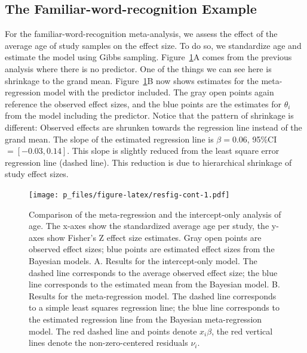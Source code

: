 \documentclass[english,,man]{apa6}
\begin{document}
\hypertarget{the-familiar-word-recognition-example}{%
\subsection{The Familiar-word-recognition Example}\label{the-familiar-word-recognition-example}}

For the familiar-word-recognition meta-analysis, we assess the effect of the average age of study samples on the effect size. To do so, we standardize age and estimate the model using Gibbs sampling. Figure~\ref{fig:resfig-cont}A comes from the previous analysis where there is no predictor. One of the things we can see here is shrinkage to the grand mean. Figure~\ref{fig:resfig-cont}B now shows estimates for the meta-regression model with the predictor included. The gray open points again reference the observed effect sizes, and the blue points are the estimates for \(\theta_i\) from the model including the predictor. Notice that the pattern of shrinkage is different: Observed effects are shrunken towards the regression line instead of the grand mean. The slope of the estimated regression line is \(\beta = 0.06\), 95\%CI \(= [-0.03, 0.14]\). This slope is slightly reduced from the least square error regression line (dashed line). This reduction is due to hierarchical shrinkage of study effect sizes.

\begin{figure}
\centering
\texttt{[image: p\_files/figure-latex/resfig-cont-1.pdf]}
\caption{\label{fig:resfig-cont}Comparison of the meta-regression and the intercept-only analysis of age. The x-axes show the standardized average age per study, the y-axes show Fisher's Z effect size estimates. Gray open points are observed effect sizes; blue points are estimated effect sizes from the Bayesian models. A. Results for the intercept-only model. The dashed line corresponds to the average observed effect size; the blue line corresponds to the estimated mean from the Bayesian model. B. Results for the meta-regression model. The dashed line corresponds to a simple least squares regression line; the blue line corresponds to the estimated regression line from the Bayesian meta-regression model. The red dashed line and points denote \(x_i\beta\), the red vertical lines denote the non-zero-centered residuals \(\nu_i\).}
\end{figure}
\end{document}
